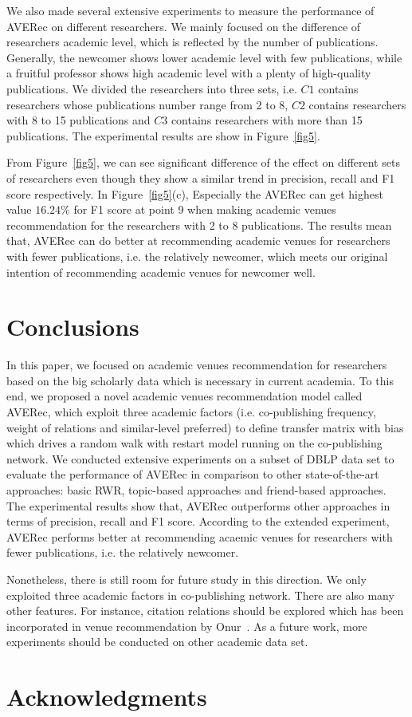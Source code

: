 \documentclass[9pt]{acm_proc_article-sp}
\begin{document}
We also made several extensive experiments to measure the performance of AVERec on different researchers. We mainly focused on the difference of researchers academic level, which is reflected by the number of publications. Generally, the newcomer shows lower academic level with few publications, while a fruitful professor shows high academic level with a plenty of high-quality publications. We divided the researchers into three sets, i.e. $C1$ contains researchers whose publications number range from 2 to 8, $C2$ contains researchers with 8 to 15 publications and $C3$ contains researchers with more than 15 publications. The experimental results are show in Figure~\ref{fig5}.

From Figure~\ref{fig5}, we can see significant difference of the effect on different sets of researchers even though they show a similar trend in precision, recall and F1 score respectively. In Figure~\ref{fig5}(c), Especially the AVERec can get highest value $16.24\%$ for F1 score at point 9 when making academic venues recommendation for the researchers with 2 to 8 publications. The results mean that, AVERec can do better at recommending academic venues for researchers with fewer publications, i.e. the relatively newcomer, which meets our original intention of recommending academic venues for newcomer well.

\section{Conclusions}
In this paper, we focused on academic venues recommendation for researchers based on the big scholarly data which is necessary in current academia. To this end, we proposed a novel academic venues recommendation model called AVERec, which exploit three academic factors (i.e. co-publishing frequency, weight of relations and similar-level preferred) to define transfer matrix with bias which drives a random walk with restart model running on the co-publishing network. We conducted extensive experiments on a subset of DBLP data set to evaluate the performance of AVERec in comparison to other state-of-the-art approaches: basic RWR, topic-based approaches and friend-based approaches. The experimental results show that, AVERec outperforms other approaches in terms of precision, recall and F1 score. According to the extended experiment, AVERec performs better at recommending acaemic venues for researchers with fewer publications, i.e. the relatively newcomer.

Nonetheless, there is still room for future study in this direction. We only exploited three academic factors in co-publishing network. There are also many other features. For instance, citation relations should be explored which has been incorporated in venue recommendation by Onur~\cite{kuccuktuncc2012recommendation}. As a future work, more experiments should be conducted on other academic data set.

\section{Acknowledgments}




\balancecolumns
\end{document}
